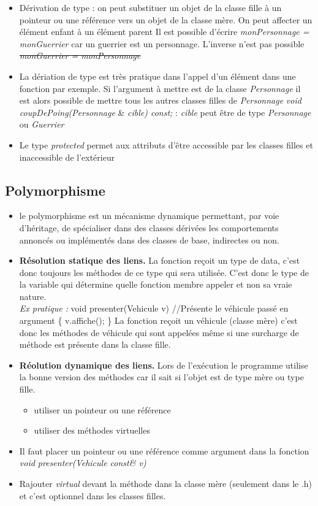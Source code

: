 \documentclass[12pt,a4paper]{article}
\begin{document}
\begin{itemize}
\item Dérivation de type : on peut substituer un objet de la classe fille à un pointeur ou une référence vers un objet de la classe mère. On peut affecter un élément enfant à un élément parent
\newline Il est possible d'écrire \textit{monPersonnage = monGuerrier} car un guerrier est un personnage. L'inverse n'est pas possible \sout{\textit{monGuerrier = monPersonnage}}
\item La dériation de type est très pratique dans l'appel d'un élément dans une fonction par exemple. Si l'argument à mettre est de la classe \textit{Personnage} il est alors possible de mettre tous les autres classes filles de \textit{Personnage}
\newline \textit{void coupDePoing(Personnage} \& \textit{cible) const;} : \textit{cible} peut être de type \textit{Personnage} ou \textit{Guerrier}
\item Le type \textit{protected} permet aux attributs d'être accessible par les classes filles et inaccessible de l'extérieur
\end{itemize}

\subsection{Polymorphisme}
\begin{itemize}
\item  le polymorphisme est un mécanisme dynamique permettant, par voie d'héritage, de spécialiser dans des classes dérivées les comportements annoncés ou implémentés dans des classes de base, indirectes ou non.
\item \textbf{Résolution statique des liens.} La fonction reçoit un type de data, c'est donc toujours les méthodes de ce type qui sera utilisée. C'est donc le type de la variable qui détermine quelle fonction membre appeler et non sa vraie nature.\\
\textit{Ex pratique : } 
\newline void presenter(Vehicule v)  //Présente le véhicule passé en argument
\newline \{  v.affiche(); \}
\newline La fonction reçoit un véhicule (classe mère) c’est donc les méthodes de véhicule qui sont appelées même si une surcharge de méthode est présente dans la classe fille.
\item \textbf{Réolution dynamique des liens.} Lors de l'exécution le programme utilise la bonne version des méthodes car il sait si l'objet est de type mère ou type fille.
\begin{itemize}
\item utiliser un pointeur ou une référence
\item utiliser des méthodes virtuelles
\end{itemize}
\item Il faut placer un pointeur ou une référence comme argument dans la fonction \textit{void presenter(Vehicule const\& v)}
\item Rajouter \textit{virtual} devant la méthode dans la classe mère (seulement dans le .h) et c’est optionnel dans les classes filles.
\end{itemize}
\end{document}
